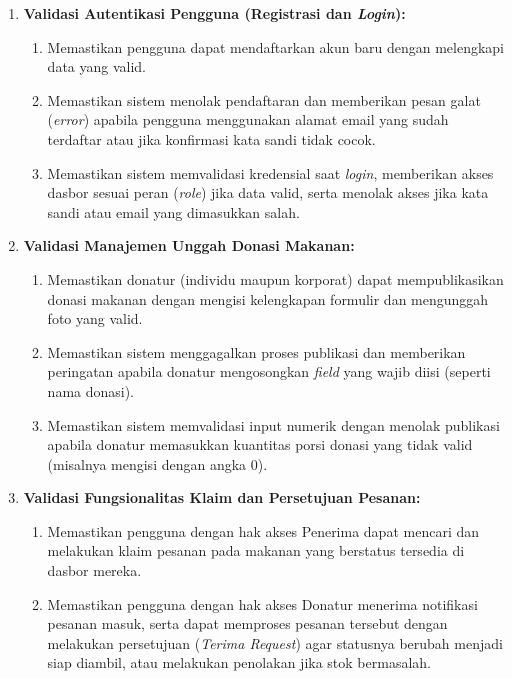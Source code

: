 \begin{enumerate}[label=\arabic*.]
    \item \textbf{Validasi Autentikasi Pengguna (Registrasi dan \textit{Login}):}
    \begin{enumerate}[label=\alph*.]
        \item Memastikan pengguna dapat mendaftarkan akun baru dengan melengkapi data yang valid.
        \item Memastikan sistem menolak pendaftaran dan memberikan pesan galat (\textit{error}) apabila pengguna menggunakan alamat email yang sudah terdaftar atau jika konfirmasi kata sandi tidak cocok.
        \item Memastikan sistem memvalidasi kredensial saat \textit{login}, memberikan akses dasbor sesuai peran (\textit{role}) jika data valid, serta menolak akses jika kata sandi atau email yang dimasukkan salah.
    \end{enumerate}
    
    \item \textbf{Validasi Manajemen Unggah Donasi Makanan:}
    \begin{enumerate}[label=\alph*.]
        \item Memastikan donatur (individu maupun korporat) dapat mempublikasikan donasi makanan dengan mengisi kelengkapan formulir dan mengunggah foto yang valid.
        \item Memastikan sistem menggagalkan proses publikasi dan memberikan peringatan apabila donatur mengosongkan \textit{field} yang wajib diisi (seperti nama donasi).
        \item Memastikan sistem memvalidasi input numerik dengan menolak publikasi apabila donatur memasukkan kuantitas porsi donasi yang tidak valid (misalnya mengisi dengan angka 0).
    \end{enumerate}
    
    \item \textbf{Validasi Fungsionalitas Klaim dan Persetujuan Pesanan:}
    \begin{enumerate}[label=\alph*.]
        \item Memastikan pengguna dengan hak akses Penerima dapat mencari dan melakukan klaim pesanan pada makanan yang berstatus tersedia di dasbor mereka.
        \item Memastikan pengguna dengan hak akses Donatur menerima notifikasi pesanan masuk, serta dapat memproses pesanan tersebut dengan melakukan persetujuan (\textit{Terima Request}) agar statusnya berubah menjadi siap diambil, atau melakukan penolakan jika stok bermasalah.
    \end{enumerate}
\end{enumerate}

